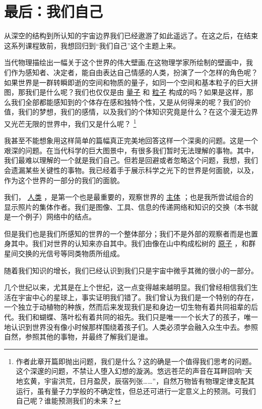 	\chapter{最后：我们自己}
\indent

    从深空的结构到所认知的宇宙边界我们已经遨游了如此遥远了。在这之后，在结束这系列课程致前，我想回归到“我们自己”这个主题上来。

    当代物理描绘出一幅关于这个世界的伟大壁画,在这物理学家所绘制的壁画中，我们作为感知者、决定者，能自由表达自己情感的人类，扮演了一个怎样的角色呢？如果世界是一群转瞬即逝的空间和物质的量子，如同一个空间和基本粒子的巨大拼图，那我们是什么呢？我们也仅仅是由
\href{http://toyhouse.cc/wiki/index.php/量子}{量子}
和
\href{http://toyhouse.cc/wiki/index.php/粒子}{粒子}
构成的吗？如果是这样，那么我们全部都能感知到的个体存在感和独特个性，又是从何得来的呢？我们的价值，我们的梦想，我们的感情，以及我们的个体知识究竟是什么？在这个漫无边界又光芒无限的世界中，我们又是什么呢？
\footnote[1]
{ 
作者此章开篇即抛出问题，我们是什么？这的确是一个值得我们思考的问题。这个深邃的问题，不禁让人堕入幻想的漩涡。悠远苍茫的声音在耳畔回响“天地玄黄，宇宙洪荒，日月盈昃，辰宿列张……”，自然万物皆有物理定律支配其运行，虽有量子力学般的不确定性，但总还可进行一定意义上的预测。可我们自己呢？谁能预测我们的未来？
}

    我甚至不能想象用这样简单的篇幅真正完美地回答这样一个深奥的问题。这是一个艰深的问题。在当代科学的巨大图景中，有很多我们暂时无法理解的事物。其中，我们最难以理解的一个就是我们自己。但若是回避或者忽略这个问题，我想，我们会遗漏某些关键性的事物。我已经着手于展示科学之光下的世界是何面貌，以及，作为这个世界的一部分的我们的面貌。

    我们，
\href{http://toyhouse.cc/wiki/index.php/人类}{人类}
，是第一个也是最重要的，观察世界的
\href{http://toyhouse.cc/wiki/index.php/主体}{主体}
；也是我所尝试组合的显示照片的集体作者。我们是图像、工具、信息的传递网络和知识的交换（本书就是一个例子）网络中的结点。

    但是我们也是我们所感知的世界的一个整体部分；我们不是外部的观察者而是也置身其中。我们对世界的认知来亦自其中。我们由像在山中构成松树的
\href{http://toyhouse.cc/wiki/index.php/原子}{原子}
，和群星间交换的光信号等同类物质所组成。

    随着我们知识的增长，我们已经认识到我们只是宇宙中微乎其微的很小的一部分。

    几个世纪以来，尤其是在上个世纪，这一点变得越来越明显。我们曾经相信我们生活在宇宙中心的星球上，事实证明我们错了。我们曾认为我们是一个特别的存在，一个独立于动植物的种族，然而后来发现我们是和身边一切生物有着共同祖辈的后代。我们和蝴蝶、落叶松有着共同的祖先。我们只是唯一一个长大了的孩子，唯一地认识到世界没有像小时候那样围绕着孩子们。人类必须学会融入众生中去。参照自然，参照其他的事物，并最终了解我们是谁。


